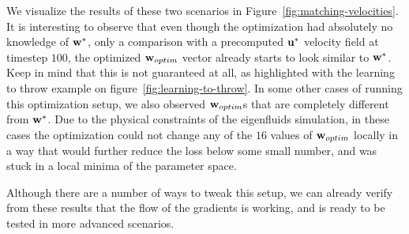 We visualize the results of these two scenarios in
Figure~\ref{fig:matching-velocities}. It is interesting to observe that even
though the optimization had absolutely no knowledge of $\vb{w}^*$, only
a comparison with a precomputed $\vb{u^*}$ velocity field at timestep $100$, the
optimized $\vb{w}_{optim}$ vector already starts to look similar to $\vb{w}^*$.
Keep in mind that this is not guaranteed at all, as highlighted with the
learning to throw example on figure~\ref{fig:learning-to-throw}. In some other
cases of running this optimization setup, we also observed $\vb{w}_{optim}$s
that are completely different from $\vb{w}^*$. Due to the physical constraints
of the eigenfluids simulation, in these cases the optimization could not change
any of the $16$ values of $\vb{w}_{optim}$ locally in a way that would further
reduce the loss below some small number, and was stuck in a local minima of the
parameter space.

Although there are a number of ways to tweak this setup, we can already verify
from these results that  the flow of the gradients is working, and is ready to
be tested in more advanced scenarios.

